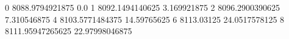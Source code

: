 0 8088.9794921875 0.0
1 8092.1494140625 3.169921875
2 8096.2900390625 7.310546875
4 8103.5771484375 14.59765625
6 8113.03125 24.0517578125
8 8111.95947265625 22.97998046875
